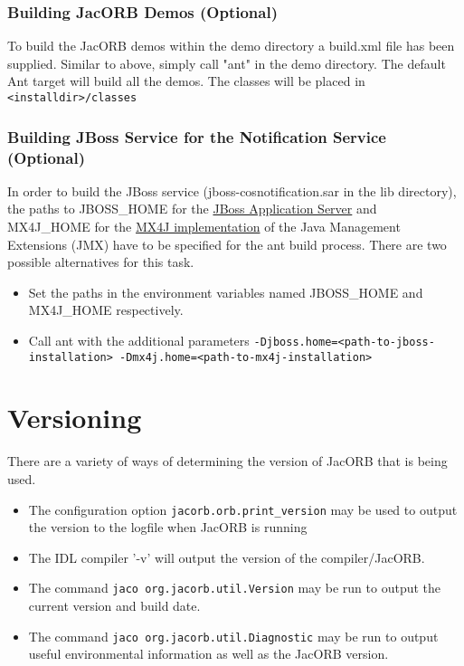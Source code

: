 
\subsubsection{Building JacORB Demos (Optional)}
To build the JacORB demos within the demo directory a build.xml file
has been supplied. Similar to above, simply call "ant" in the demo directory.
The default Ant target will build all the demos. The classes will be placed
in {\tt <installdir>/classes}

\subsubsection{Building JBoss Service for the Notification Service (Optional)}
In order to build the JBoss service (jboss-cosnotification.sar in the lib
directory), the paths to JBOSS\_HOME for the
\href{http://www.jboss.org/jbossas}{JBoss Application Server} and MX4J\_HOME
for the \href{http://mx4j.sourceforge.net}{MX4J implementation}
 of the Java Management Extensions (JMX) have to be specified for the ant build
process. There are two possible alternatives for this task.
\begin{itemize}
\item Set the paths in the environment variables named JBOSS\_HOME and MX4J\_HOME respectively.
\item Call ant with the additional parameters {\tt -Djboss.home=<path-to-jboss-installation> -Dmx4j.home=<path-to-mx4j-installation>}
\end{itemize}


\section{Versioning}
There are a variety of ways of determining the version of JacORB that is being used.
\begin{itemize}
\item The configuration option {\tt jacorb.orb.print\_version} may be used to output the version to the logfile when JacORB is running
\item The IDL compiler '-v' will output the version of the compiler/JacORB.
\item The command {\tt jaco org.jacorb.util.Version} may be run to output the current version and build date.
\item The command {\tt jaco org.jacorb.util.Diagnostic} may be run to output useful environmental information as well as the JacORB version.
\end{itemize}

